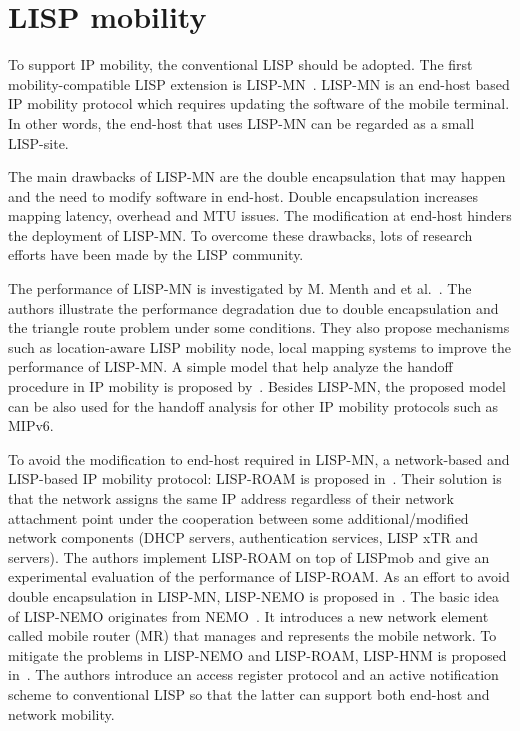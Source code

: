 \section{LISP mobility}
\label{sec:mobility}

To support IP mobility, the conventional LISP should be adopted. The first mobility-compatible LISP extension is LISP-MN~\cite{mn00}\cite{natal2013lisp}. LISP-MN is an end-host based IP mobility protocol which requires updating the software of the mobile terminal. In other words, the end-host that uses LISP-MN can be regarded as a small LISP-site.

The main drawbacks of LISP-MN are the double encapsulation that may happen and the need to modify software in end-host. Double encapsulation increases mapping latency, overhead and MTU issues. The modification at end-host hinders the deployment of LISP-MN. To overcome these drawbacks, lots of research efforts have been made by the LISP community.

The performance of LISP-MN is investigated by M. Menth and et al.~\cite{menth2010improvements}. The authors illustrate the performance degradation due to double encapsulation and the triangle route problem under some conditions. They also propose mechanisms such as location-aware LISP mobility node, local mapping systems to improve the performance of LISP-MN. A simple model that help analyze the handoff procedure in IP mobility is proposed by~\cite{phoomikiattisak2016control}. Besides LISP-MN, the proposed model can be also used for the handoff analysis for other IP mobility protocols such as MIPv6. 

To avoid the modification to end-host required in LISP-MN, a network-based and LISP-based IP mobility protocol: LISP-ROAM is proposed in~\cite{galvani2014lisp}. Their solution is that the network assigns the same IP address regardless of their network attachment point under the cooperation between some additional/modified network components (DHCP servers, authentication services, LISP xTR and servers). The authors implement LISP-ROAM on top of LISPmob and give an experimental evaluation of the performance of LISP-ROAM. As an effort to avoid double encapsulation in LISP-MN, LISP-NEMO is proposed in~\cite{wu2014nemo}. The basic idea of LISP-NEMO originates from NEMO~\cite{jeon2010network}. It introduces a new network element called mobile router (MR) that manages and represents the mobile network. To mitigate the problems in LISP-NEMO and LISP-ROAM, LISP-HNM is proposed in~\cite{tang2017lisp}. The authors introduce an access register protocol and an active
notification scheme to conventional LISP so that the latter can support both end-host and network mobility.

